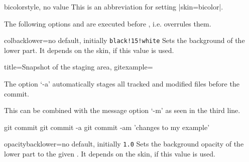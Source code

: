 \clearpage

\begin{docTcbKey}{bicolor}{}{style, no value}
  This is an abbreviation for setting |skin=bicolor|.
\end{docTcbKey}


\begin{dispExample}
\end{dispExample}

\clearpage


\begin{marker}
  The following options  and 
  are executed before , i.e.
   overrules them.
\end{marker}

\begin{docTcbKey}{colbacklower}{=}{no default, initially \texttt{black!15!white}}
  Sets the background  of the lower part. It depends on the skin,
  if this value is used.
\end{docTcbKey}

\begin{dispExample}

\begin{tcblisting}{title={Snapshot of the staging area},
  gitexample={The option `-a' automatically stages all tracked and modified
              files before the commit.\par
              This can be combined with the message option `-m'
              as seen in the third line.}}
git commit
git commit -a
git commit -am 'changes to my example'
\end{tcblisting}
\end{dispExample}

\smallskip

\begin{docTcbKey}[][doc new=2021-05-21]{opacitybacklower}{=}{no default, initially \texttt{1.0}}
  Sets the background opacity of the lower part to the given .
  It depends on the skin, if this value is used.
\end{docTcbKey}

